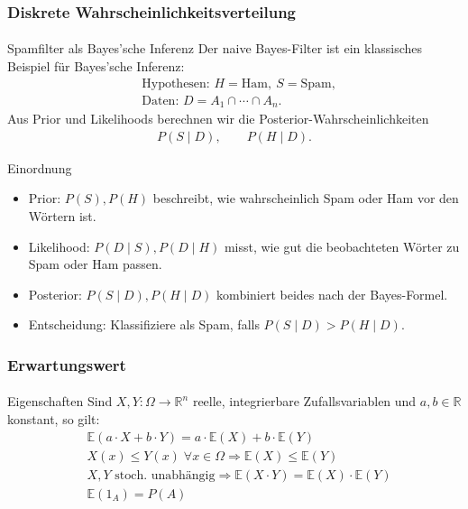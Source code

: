 \documentclass{beamer}
\begin{document}
\begin{frame}[shrink=5]
    \frametitle{Diskrete Wahrscheinlichkeitsverteilung}
\framesubtitle{}

\begin{block}{Spamfilter als Bayes'sche Inferenz}
Der naive Bayes-Filter ist ein klassisches Beispiel für Bayes'sche Inferenz:
\begin{align*}
&\text{Hypothesen: } H=\text{Ham},\ S=\text{Spam}, \\
&\text{Daten: } D = A_1 \cap \cdots \cap A_n.
\end{align*}
Aus Prior und Likelihoods berechnen wir die Posterior-Wahrscheinlichkeiten
\begin{align*}
P(S \mid D), \qquad P(H \mid D).
\end{align*}
\end{block}

\begin{block}{Einordnung}
\begin{itemize}
\item Prior: $P(S), P(H)$ beschreibt, wie wahrscheinlich Spam oder Ham vor den Wörtern ist.
\item Likelihood: $P(D \mid S), P(D \mid H)$ misst, wie gut die beobachteten Wörter zu Spam oder Ham passen.
\item Posterior: $P(S \mid D), P(H \mid D)$ kombiniert beides nach der Bayes-Formel.
\item Entscheidung: Klassifiziere als Spam, falls $P(S \mid D) > P(H \mid D)$.
\end{itemize}
\end{block}

 \end{frame}





 \begin{frame}
    \frametitle{Erwartungswert}
\framesubtitle{}
\begin{block}{Eigenschaften}
Sind $X,Y : \Omega \to \mathbb{R}^n$   reelle, integrierbare  Zufallsvariablen und $a,b \in \mathbb{R}$ konstant, so gilt:
\begin{align*}
& \mathbb{E}(a \cdot X + b \cdot Y) = a \cdot \mathbb{E}(X) + b \cdot \mathbb{E}(Y) \\
& X(x) \leq Y(x) \;  \forall x \in \Omega \Rightarrow \mathbb{E}(X) \leq \mathbb{E}(Y) \\
& X ,Y \text{ stoch. unabhängig} \Rightarrow   \mathbb{E}(X \cdot Y) =  \mathbb{E}(X) \cdot  \mathbb{E}(Y) \\
& \mathbb{E} (1_A) = P (A)
\end{align*}
\end{block}
 \end{frame}
\end{document}
